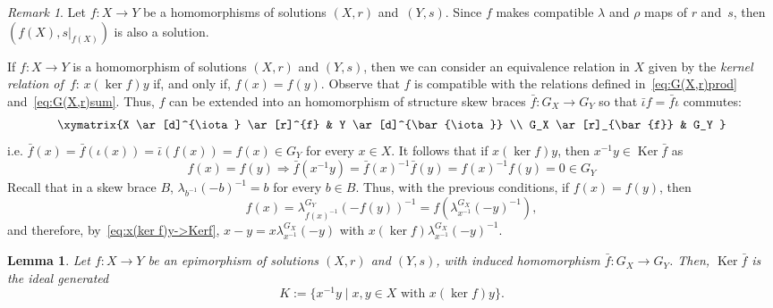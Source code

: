 \documentclass[12pt, a4paper, english]{article}
\newtheorem{lema}[teorema]{Lemma}
\theoremstyle{definition}
\theoremstyle{remark}
\newtheorem*{nota}{Remark}
\DeclareMathOperator{\Ker}{Ker}
\newcounter{cond}
\begin{document}
\begin{nota}
\label{nota:tots_hom_epi}
Let $f\colon X \rightarrow Y$ be a homomorphisms of solutions $(X,r)$ and~$(Y,s)$. Since $f$ makes compatible $\lambda$ and $\rho$ maps of $r$ and~$s$, then $(f(X), \left.s\right|_{f(X)})$ is also a solution. 
\end{nota}

If $f\colon X \rightarrow Y$ is a homomorphism of solutions $(X,r)$ and $(Y,s)$, then we can consider an equivalence relation in $X$ given by the \emph{kernel relation of~$f$}: $x (\ker f) y$ if, and only if, $f(x) = f(y)$. Observe that $f$ is compatible with the relations defined in~\eqref{eq:G(X,r)prod} and~\eqref{eq:G(X,r)sum}. Thus, 
$f$ can be extended into an homomorphism of structure skew braces $\bar{f} \colon G_X \rightarrow G_Y$ so that $\bar{\iota}f = \bar{f}\iota$ commutes:
\[
\xymatrix{X \ar[d]^{\iota} \ar[r]^{f}  & Y \ar[d]^{\bar{\iota}} \\ G_X \ar[r]_{\bar{f}}  & G_Y }
\]
i.e. $\bar{f}(x) = \bar f(\iota(x)) = \bar{\iota}(f(x)) = f(x) \in G_Y$ for every $x\in X$. It follows that if $x (\ker f) y$, then $x^{-1}y\in \Ker \bar f$ as
\begin{equation}
\label{eq:x(ker f)y->Kerf}
f(x) = f(y) \Rightarrow \bar{f}(x^{-1}y) = \bar{f}(x)^{-1}\bar f(y) = f(x)^{-1}f(y) = 0 \in G_Y
\end{equation}
Recall that in a skew brace $B$, $\lambda_{b^{-1}}(-b)^{-1} = b$ for every $b\in B$. Thus, with the previous conditions, if $f(x) = f(y)$, then 
\[ f(x) = \lambda^{G_Y}_{f(x)^{-1}}(-f(y))^{-1} = f(\lambda^{G_X}_{x^{-1}}(-y)^{-1}),\]
and therefore, by~\eqref{eq:x(ker f)y->Kerf}, $x-y = x\lambda^{G_X}_{x^{-1}}(-y)$ with $x(\ker f) \lambda^{G_X}_{x^{-1}}(-y)^{-1}$.

\begin{lema}
\label{lema:kerbarf}
Let $f \colon X \rightarrow Y$ be an epimorphism of solutions $(X,r)$ and $(Y,s)$, with induced homomorphism $\bar f\colon G_X \rightarrow G_Y$. Then, $\Ker \bar f$ is the ideal generated 
\[ K:= \{x^{-1}y \mid \text{$x,y \in X$ with $x (\ker f) y$}\}.\]
\end{lema}
\end{document}
